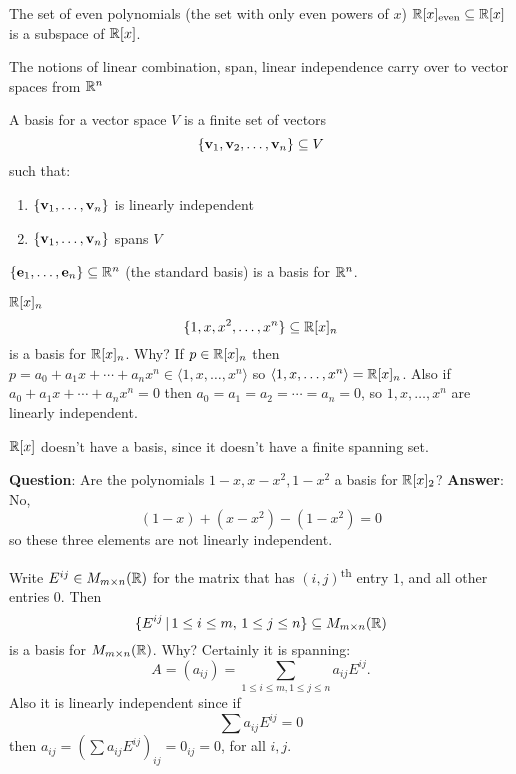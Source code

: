 \documentclass[10pt, a4paper]{article}
\newcommand{\ts}[1]{\textsuperscript{#1}}
\begin{document}
\begin{example}
    The set of even polynomials
    (the set with only even powers of $x$)
    $\mathbb{R}[x]_{\text{even}} \subseteq \mathbb{R}[x]$
    is a subspace of $\mathbb{R}[x]$.
\end{example}



The notions of linear combination, span,
linear independence carry over to vector spaces from $\mathbb{R} ^ n$

\begin{definition}[Basis]
    A basis for a vector space $V$ is a finite set of vectors
    \[
    \{\mathbf{v}_1, \mathbf{v}_2, \dotsc, \mathbf{v}_n\} \subseteq V
    \]
    such that:
    \begin{enumerate}[label = (\roman*)]
        \item $\{\mathbf{v}_1, \dotsc, \mathbf{v}_n\}$ is linearly independent
        \item $\{\mathbf{v}_1, \dotsc, \mathbf{v}_n\}$ spans $V$
    \end{enumerate}
\end{definition}


\begin{example}
    $\{\mathbf{e}_1, \dotsc, \mathbf{e}_n\} \subseteq \mathbb{R} ^ n$
    (the standard basis)
    is a basis for $\mathbb{R} ^ n$.
\end{example}
\begin{example}
    $\mathbb{R}[x]_n$
    \[
    \{1, x, x ^ 2, \dotsc, x ^ n\} \subseteq \mathbb{R}[x]_n
    \]
    is a basis for $\mathbb{R}[x]_n$.
    Why?
    If $p \in \mathbb{R}[x]_n$ then
    $p = a_0 + a_1x + \dotsi + a_nx ^ n \in \langle 1, x, \dotsc, x ^ n\rangle$
    so $\langle 1, x, \dotsc, x ^ n\rangle = \mathbb{R}[x]_n$.
    Also if $a_0 + a_1x + \dotsi + a_nx ^ n = 0$ then $a_0 = a_1 = a_2 = \dotsi = a_n = 0$,
    so $1, x, \dotsc, x ^ n$ are linearly independent.
\end{example}

$\mathbb{R}[x]$ doesn't have a basis,
since it doesn't have a finite spanning set.

\textbf{Question}:
Are the polynomials $1 - x, x - x ^ 2, 1 - x ^ 2$ a basis for $\mathbb{R}[x]_2$?
\textbf{Answer}:
No,
\[
(1 - x) + (x - x ^ 2) - (1 - x ^ 2) = 0
\]
so these three elements are not linearly independent.

\begin{example}
    Write $E^{ij} \in M_{m \times n}(\mathbb{R})$ for the matrix that has $(i, j)$\ts{th} entry $1$,
    and all other entries $0$.
    Then
    \[
    \{E ^ {ij}\,|\, 1 \leq i \leq m,\, 1 \leq j \leq n\} \subseteq M_{m \times n}(\mathbb{R})
    \]
    is a basis for $M_{m \times n}(\mathbb{R})$.
    Why?
    Certainly it is spanning:
    \[
    A = (a_{ij}) = \sum_{1 \leq i \leq m, 1 \leq j \leq n}a_{ij}E ^ {ij}.
    \]
    Also it is linearly independent since if
    \[
    \sum a_{ij}E^{ij} = 0
    \]
    then $a_{ij} = \left(\sum a_{ij}E^{ij}\right)_{ij} = 0_{ij} = 0$,
    for all $i, j$.
\end{example}
\end{document}
